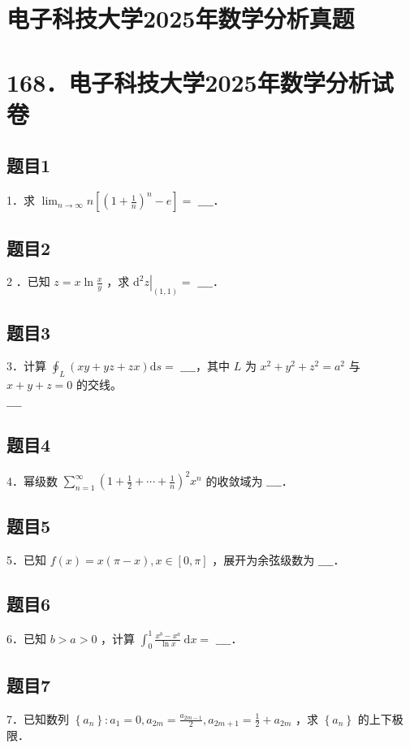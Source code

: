 \documentclass{article}
\begin{document}
\section*{电子科技大学2025年数学分析真题}
\section*{168．电子科技大学2025年数学分析试卷}

\subsection{题目1}
1．求 \(\lim _{n \rightarrow \infty} n\left[\left(1+\frac{1}{n}\right)^{n}-e\right]=\) \(\_\_\_\_\)．

\subsection{题目2}
2 ．已知 \(z=x \ln \frac{x}{y}\) ，求 \(\left.\mathrm{d}^{2} z\right|_{(1,1)}=\) \(\_\_\_\_\)．

\subsection{题目3}
3．计算 \(\oint_{L}(x y+y z+z x) \mathrm{d} s=\) \(\_\_\_\_\)，其中 \(L\) 为 \(x^{2}+y^{2}+z^{2}=a^{2}\) 与 \(x+y+z=0\) 的交线。\\
\(\_\_\_\_\)

\subsection{题目4}
4．幂级数 \(\sum_{n=1}^{\infty}\left(1+\frac{1}{2}+\cdots+\frac{1}{n}\right)^{2} x^{n}\) 的收敛域为 \(\_\_\_\_\)．

\subsection{题目5}
5．已知 \(f(x)=x(\pi-x), x \in[0, \pi]\) ，展开为余弦级数为 \(\_\_\_\_\)．

\subsection{题目6}
6．已知 \(b>a>0\) ，计算 \(\int_{0}^{1} \frac{x^{b}-x^{a}}{\ln x} \mathrm{~d} x=\) \(\_\_\_\_\)．

\subsection{题目7}
7．已知数列 \(\left\{a_{n}\right\}: a_{1}=0, a_{2 m}=\frac{a_{2 m-1}}{2}, a_{2 m+1}=\frac{1}{2}+a_{2 m}\) ，求 \(\left\{a_{n}\right\}\) 的上下极限．
\end{document}
